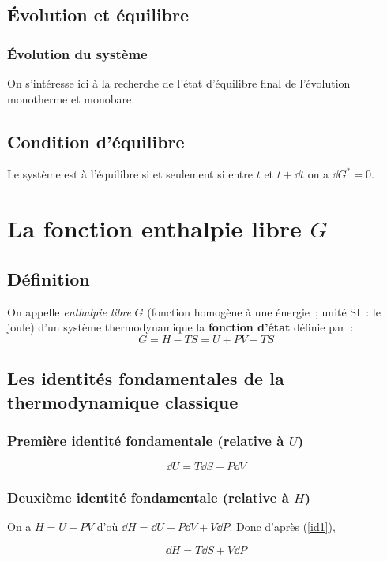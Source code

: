 \documentclass{article}
\let\oldref\ref
\renewcommand{\ref}[1]{(\oldref{#1})}
\begin{document}
\subsection{Évolution et équilibre}
\subsubsection{Évolution du système}
On s'intéresse ici à la recherche de l'état d'équilibre final de l'évolution monotherme et monobare.

\subsection{Condition d'équilibre}
\begin{tableau}
    Le système est à l'équilibre si et seulement si entre $t$ et $t+\dd{t}$ on a $\dd{G^*} = 0$.
\end{tableau}

\section{La fonction enthalpie libre $G$}
\subsection{Définition}
\begin{enonce}
    On appelle \textit{enthalpie libre} $G$ (fonction homogène à une énergie~; unité SI~: le joule) d'un système thermodynamique la \textbf{fonction d'état} définie par~:
    $$G = H-TS = U + PV-TS$$
\end{enonce}

\subsection{Les identités fondamentales de la thermodynamique classique}
\subsubsection{Première identité fondamentale (relative à $U$)}
\begin{tableau}
    \begin{important}
        \begin{equation}\label{id1}
            \dd{U} = T\dd{S} - P\dd{V}
        \end{equation}
    \end{important}
\end{tableau}
\subsubsection{Deuxième identité fondamentale (relative à $H$)}
\begin{tableau}
    On a $H = U+PV$ d'où $\dd{H} = \dd{U} + P\dd{V} + V\dd{P}$. Donc d'après \ref{id1},
    \begin{important}
        \begin{equation}\label{id2}
            \dd{H} = T\dd{S} + V\dd{P}
        \end{equation}
    \end{important}
\end{tableau}
\end{document}
